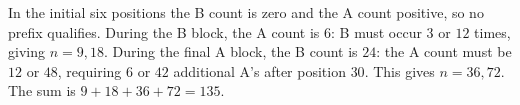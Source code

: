 In the initial six positions the B count is zero and the A count positive, so no prefix qualifies. During the B block, the A count is $6$: B must occur $3$ or $12$ times, giving $n=9,18$. During the final A block, the B count is $24$: the A count must be $12$ or $48$, requiring $6$ or $42$ additional A's after position $30$. This gives $n=36,72$. The sum is $9+18+36+72=\boxed{135}$.

